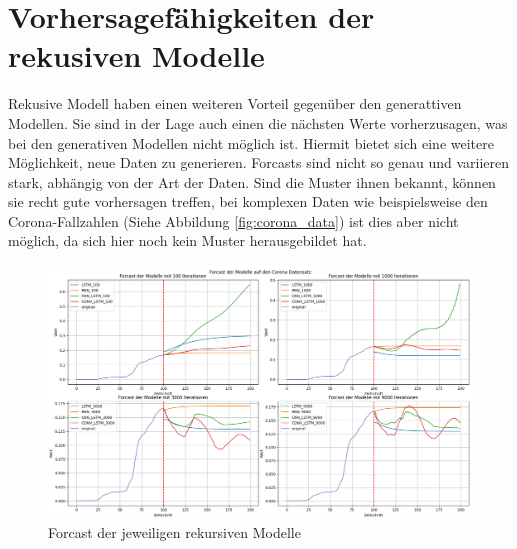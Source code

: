 \section{Vorhersagefähigkeiten der rekusiven Modelle}
Rekusive Modell haben einen weiteren Vorteil gegenüber den generattiven Modellen. Sie sind in der Lage auch einen die nächsten Werte vorherzusagen, was bei den generativen Modellen nicht möglich ist.
Hiermit bietet sich eine weitere Möglichkeit, neue Daten zu generieren.
Forcasts sind nicht so genau und variieren stark, abhängig von der Art der Daten. Sind die Muster ihnen bekannt, können sie recht gute vorhersagen treffen, bei komplexen Daten wie beispielsweise den Corona-Fallzahlen (Siehe Abbildung \ref{fig:corona_data})
ist dies aber nicht möglich, da sich hier noch kein Muster herausgebildet hat.


\begin{figure}[ht]
    \centering
    \includegraphics[width=1\textwidth]{includes/figures/graphs/forcast.png}
    \caption{Forcast der jeweiligen rekursiven Modelle}
    \label{fig:forcast_recursive_models}
\end{figure}







